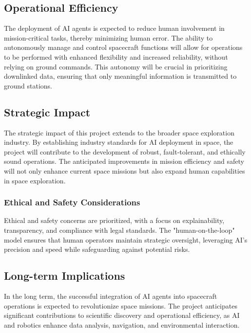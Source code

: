 \documentclass[a4paper, 11pt]{article}
\begin{document}
\subsection{Operational Efficiency}

The deployment of AI agents is expected to reduce human involvement in mission-critical tasks, thereby minimizing human error. The ability to autonomously manage and control spacecraft functions will allow for operations to be performed with enhanced flexibility and increased reliability, without relying on ground commands. This autonomy will be crucial in prioritizing downlinked data, ensuring that only meaningful information is transmitted to ground stations.

\subsection{Strategic Impact}

The strategic impact of this project extends to the broader space exploration industry. By establishing industry standards for AI deployment in space, the project will contribute to the development of robust, fault-tolerant, and ethically sound operations. The anticipated improvements in mission efficiency and safety will not only enhance current space missions but also expand human capabilities in space exploration.

\subsubsection{Ethical and Safety Considerations}

Ethical and safety concerns are prioritized, with a focus on explainability, transparency, and compliance with legal standards. The "human-on-the-loop" model ensures that human operators maintain strategic oversight, leveraging AI's precision and speed while safeguarding against potential risks.

\subsection{Long-term Implications}

In the long term, the successful integration of AI agents into spacecraft operations is expected to revolutionize space missions. The project anticipates significant contributions to scientific discovery and operational efficiency, as AI and robotics enhance data analysis, navigation, and environmental interaction.
\end{document}
